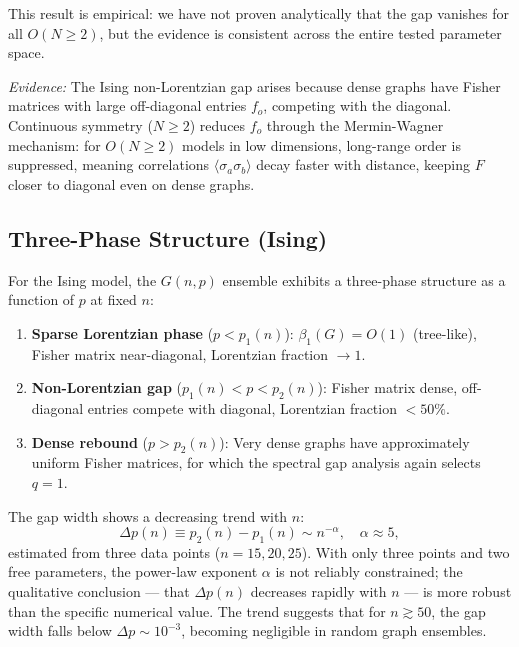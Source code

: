 \documentclass[11pt]{article}
\theoremstyle{definition}
\theoremstyle{remark}
\newcommand{\Fish}{F}
\newcommand{\edgeo}{\sigma}
\newcommand{\betti}{\beta_1}
\begin{document}
This result is empirical: we have not proven
analytically that the gap vanishes for all $O(N \geq 2)$, but the
evidence is consistent across the entire tested parameter space.

\textit{Evidence:} The Ising non-Lorentzian gap arises because dense
graphs have Fisher matrices with large off-diagonal entries $f_o$,
competing with the diagonal. Continuous symmetry ($N \geq 2$) reduces
$f_o$ through the Mermin-Wagner mechanism: for $O(N \geq 2)$ models in
low dimensions, long-range order is suppressed, meaning correlations
$\langle \edgeo_a \edgeo_b \rangle$ decay faster with distance, keeping
$\Fish$ closer to diagonal even on dense graphs.

\subsection{Three-Phase Structure (Ising)}
\label{subsec:three-phase}

For the Ising model, the $G(n, p)$ ensemble exhibits a three-phase
structure as a function of $p$ at fixed $n$:
\begin{enumerate}
\item \textbf{Sparse Lorentzian phase} ($p < p_1(n)$):
  $\betti(G) = O(1)$ (tree-like), Fisher matrix near-diagonal,
  Lorentzian fraction $\to 1$.
\item \textbf{Non-Lorentzian gap} ($p_1(n) < p < p_2(n)$):
  Fisher matrix dense, off-diagonal entries compete with diagonal,
  Lorentzian fraction $< 50\%$.
\item \textbf{Dense rebound} ($p > p_2(n)$):
  Very dense graphs have approximately uniform Fisher matrices,
  for which the spectral gap analysis again selects $q = 1$.
\end{enumerate}

The gap width shows a decreasing trend with $n$:
\begin{equation}
  \Delta p(n) \equiv p_2(n) - p_1(n)
    \sim n^{-\alpha}, \quad \alpha \approx 5,
  \label{eq:gap-width}
\end{equation}
estimated from three data points ($n = 15, 20, 25$).  With only three
points and two free parameters, the power-law exponent $\alpha$ is not
reliably constrained; the qualitative conclusion --- that $\Delta p(n)$
decreases rapidly with $n$ --- is more robust than the specific
numerical value.  The trend suggests that for $n \gtrsim 50$,
the gap width falls below $\Delta p \sim 10^{-3}$, becoming
negligible in random graph ensembles.
\end{document}
